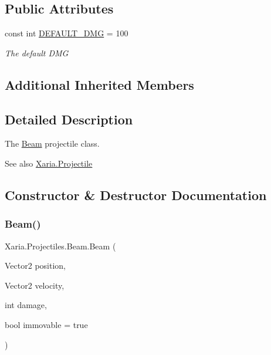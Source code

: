 \subsection*{Public Attributes}
\begin{DoxyCompactItemize}
\item 
const int \hyperlink{classXaria_1_1Projectiles_1_1Beam_acdf0eb6e8d11527d79403c0562448d1b}{D\+E\+F\+A\+U\+L\+T\+\_\+\+D\+MG} = 100
\begin{DoxyCompactList}\small\item\em The default D\+MG \end{DoxyCompactList}\end{DoxyCompactItemize}
\subsection*{Additional Inherited Members}


\subsection{Detailed Description}
The \hyperlink{classXaria_1_1Projectiles_1_1Beam}{Beam} projectile class. 

\begin{DoxySeeAlso}{See also}
\hyperlink{classXaria_1_1Projectile}{Xaria.\+Projectile}


\end{DoxySeeAlso}


\subsection{Constructor \& Destructor Documentation}
\mbox{\label{classXaria_1_1Projectiles_1_1Beam_a02a3f0e94b3ab271eae66a8ef302e5fc}} 
\subsubsection{\texorpdfstring{Beam()}{Beam()}}
{\footnotesize\ttfamily Xaria.\+Projectiles.\+Beam.\+Beam (\begin{DoxyParamCaption}\item[{Vector2}]{position,  }\item[{Vector2}]{velocity,  }\item[{int}]{damage,  }\item[{bool}]{immovable = {\ttfamily true} }\end{DoxyParamCaption})\hspace{0.3cm}{\ttfamily [inline]}}



